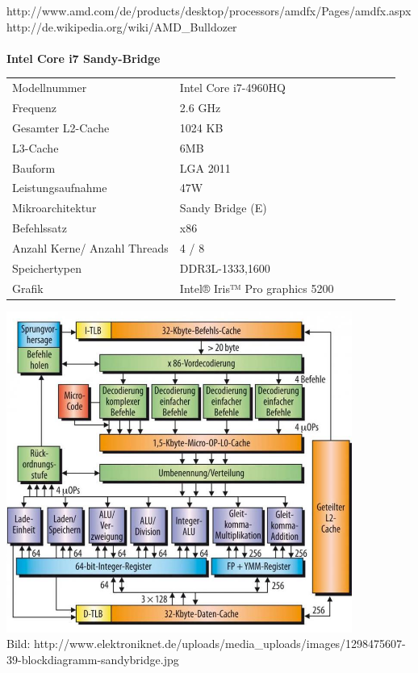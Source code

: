 \documentclass[10pt]{article}
\begin{document}
\begin{enumerate}[label=\alph*)]
	
	
	http://www.amd.com/de/products/desktop/processors/amdfx/Pages/amdfx.aspx\\
	http://de.wikipedia.org/wiki/AMD\_Bulldozer\\
	\\
	
	\textbf{Intel Core i7 Sandy-Bridge}\\
	\begin{tabular}{ l l l l l l l }
			Modellnummer & Intel Core i7-4960HQ\\
			Frequenz & 2.6 GHz\\
			Gesamter L2-Cache & 1024 KB\\
			L3-Cache & 6MB\\
			Bauform & LGA 2011\\ 
			Leistungsaufnahme & 47W\\
			Mikroarchitektur & Sandy Bridge (E)\\
			Befehlssatz & x86 \\
			Anzahl Kerne/ Anzahl Threads & 4 / 8\\
			Speichertypen & DDR3L-1333,1600\\
			Grafik & Intel® Iris™ Pro graphics 5200\\
		\end{tabular}
	
	
	\includegraphics[width=0.85\textwidth]{images/sandybridge.jpg}\\
	Bild: http://www.elektroniknet.de/uploads/media\_uploads/images/1298475607-39-blockdiagramm-sandybridge.jpg\\
	

\end{enumerate}
\end{document}
